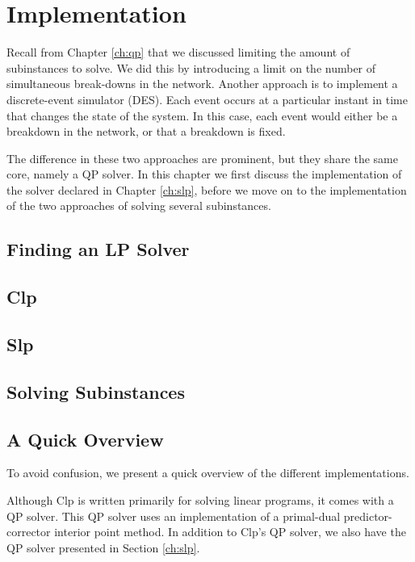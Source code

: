\section{Implementation}
Recall from Chapter \ref{ch:qp} that we discussed limiting the amount
of subinstances to solve. We did this by introducing a limit on the number of
simultaneous break-downs in the network.
Another approach is to implement a discrete-event simulator (DES). Each event
occurs at a particular instant in time that changes the state of the system.
In this case, each event would either be a breakdown in the network, or that
a breakdown is fixed.

The difference in these two approaches are prominent, but they share the same
core, namely a QP solver. In this chapter we first discuss the implementation
of the solver declared in Chapter \ref{ch:slp}, before we move on to the
implementation of the two approaches of solving several subinstances.
\label{ch:implementation}

\subsection{Finding an LP Solver}


\subsection{Clp}


\subsection{Slp}


\subsection{Solving Subinstances}


\subsection{A Quick Overview}
To avoid confusion, we present a quick overview of the different
implementations.

Although Clp is written primarily for solving linear
programs, it comes with a QP solver. This QP solver uses an implementation
of a primal-dual predictor-corrector interior point method. In addition
to Clp's QP solver, we also have the QP solver presented in Section
\ref{ch:slp}.

